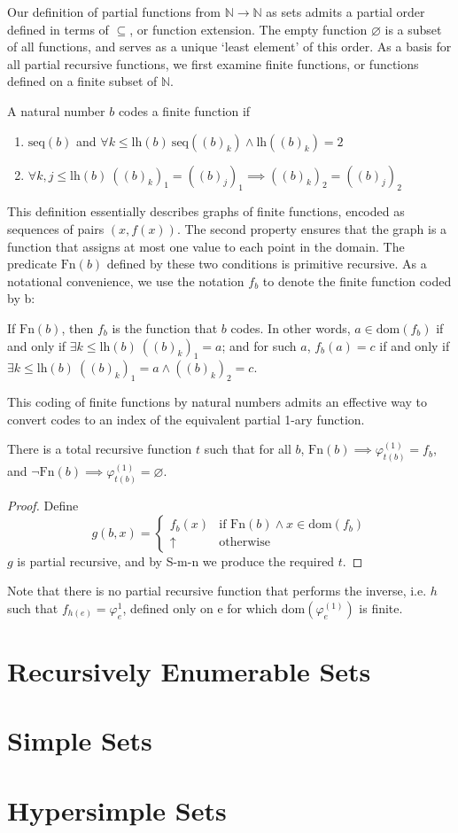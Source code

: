 Our definition of partial functions from $\mathbb{N} \rightarrow \mathbb{N}$ as sets admits a partial order defined in terms of $\subseteq$, or function extension. The empty function $\varnothing$ is a subset of all functions, and serves as a unique `least element' of this order. As a basis for all partial recursive functions, we first examine finite functions, or functions defined on a finite subset of $\mathbb{N}$.
\begin{definition}
A natural number $b$ codes a finite function if \begin{enumerate}
    \item $\text{seq}(b)$ and $\forall k \leq \text{lh}(b) \ \text{seq}\left( (b)_k \right) \land \text{lh}\left((b)_k\right) = 2$
    \item $\forall k, j \leq \text{lh}(b) \ ((b)_k)_1 = ((b)_j)_1 \implies ((b)_k)_2 = ((b)_j)_2$
\end{enumerate}
\end{definition}
This definition essentially describes graphs of finite functions, encoded as sequences of pairs $(x, f(x))$. The second property ensures that the graph is a function that assigns at most one value to each point in the domain. The predicate $\text{Fn}(b)$ defined by these two conditions is primitive recursive. As a notational convenience, we use the notation $f_b$ to denote the finite function coded by b:
\begin{definition}
If $\text{Fn}(b)$, then $f_b$ is the function that $b$ codes. In other words, $a \in \text{dom}(f_b)$ if and only if $\exists k \leq \text{lh}(b) \ ((b)_k)_1 = a$; and for such $a$, $f_b(a) = c$ if and only if  $\exists k \leq \text{lh}(b) \ ((b)_k)_1 = a \land ((b)_k)_2 = c$.
\end{definition}
This coding of finite functions by natural numbers admits an effective way to convert codes to an index of the equivalent partial 1-ary function.
\begin{lemma}
There is a total recursive function $t$ such that for all $b$, $\text{Fn}(b) \implies \varphi_{t(b)}^{(1)} = f_b$, and $\lnot \text{Fn}(b) \implies \varphi_{t(b)}^{(1)} = \varnothing$.
\end{lemma}
\begin{proof}
Define \[
    g(b, x) = \begin{cases}
        f_b(x) & \text{if } \text{Fn}(b) \land x \in \text{dom}(f_b) \\
        \uparrow & \text{otherwise}
    \end{cases}
\]
$g$ is partial recursive, and by S-m-n we produce the required $t$.
\end{proof}
Note that there is no partial recursive function that performs the inverse, i.e. $h$ such that $f_{h(e)} = \varphi_e^{1}$, defined only on e for which $\text{dom}(\varphi_e^{(1)})$ is finite.
\section{Recursively Enumerable Sets}
\section{Simple Sets}
\section{Hypersimple Sets}
